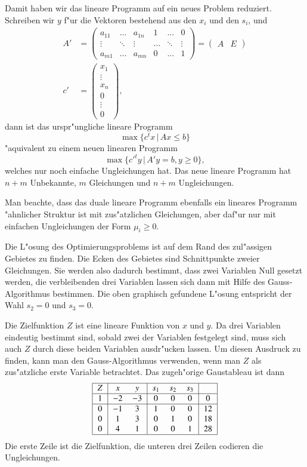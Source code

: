 Damit haben wir das lineare Programm auf ein neues Problem reduziert.
Schreiben wir $y$ f"ur die Vektoren bestehend aus den $x_i$ und den $s_i$,
und
\begin{align*}
A'&=\begin{pmatrix}
a_{11}&\dots &a_{1n}&1&\dots&0\\
\vdots&\ddots&\vdots&\dots&\ddots&\vdots\\
a_{m1}&\dots &a_{mn}&0&\dots&1
\end{pmatrix}
=\begin{pmatrix}A&E\end{pmatrix}
\\
c'&=\begin{pmatrix}x_1\\\vdots\\x_n\\0\\\vdots\\0\end{pmatrix},
\end{align*}
dann ist das urspr"ungliche lineare Programm
\[
\max\{ c^tx\,|\, Ax\le b\}
\]
"aquivalent zu einem neuen linearen Programm
\[
\max\{ c'^ty\,|\, A'y=b, y\ge 0\},
\]
welches nur noch einfache Ungleichungen hat.
Das neue lineare Programm hat $n+m$ Unbekannte, $m$ Gleichungen
und $n+m$ Ungleichungen.

Man beachte, dass das duale lineare Programm
ebenfalls ein lineares Programm "ahnlicher Struktur ist mit zus"atzlichen
Gleichungen, aber daf"ur nur mit einfachen Ungleichungen der Form
$\mu_i\ge 0$.

Die L"osung des Optimierungsproblems ist auf dem Rand des
zul"assigen Gebietes zu finden.
Die Ecken des Gebietes sind Schnittpunkte zweier Gleichungen.
Sie werden also dadurch bestimmt, dass zwei Variablen 
Null gesetzt werden, die verbleibenden drei Variablen
lassen sich dann mit Hilfe des Gauss-Algorithmus bestimmen.
Die oben graphisch gefundene L"osung entspricht der
Wahl $s_2=0$ und $s_3=0$.

Die Zielfunktion $Z$ ist eine lineare Funktion von $x$ und $y$.
Da drei Variablen eindeutig bestimmt sind, sobald zwei der
Variablen festgelegt sind, muss sich auch $Z$ durch diese beiden
Variablen ausdr"ucken lassen.
Um diesen Ausdruck zu finden,
kann man den Gauss-Algorithmus
verwenden, wenn man $Z$ als zus"atzliche erste Variable betrachtet.
Das zugeh"orige Gaustableau ist dann
\[
\begin{tabular}{|>{$}c<{$}|>{$}c<{$}>{$}c<{$}|>{$}c<{$}>{$}c<{$}>{$}c<{$}|>{$}c<{$}|}
\hline
Z&x&y&s_1&s_2&s_3& \\
\hline
1&-2&-3& 0& 0& 0& 0\\
\hline
0&-1& 3& 1& 0& 0&12\\
0& 1& 3& 0& 1& 0&18\\
0& 4& 1& 0& 0& 1&28\\
\hline
\end{tabular}
\]
Die erste Zeile ist die Zielfunktion, die unteren drei Zeilen codieren die
Ungleichungen.

